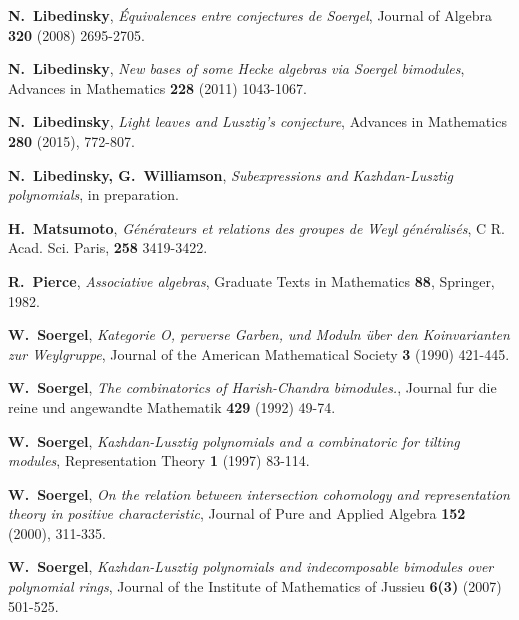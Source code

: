 \documentclass[12pt]{wart}
\theoremstyle{remark}
\begin{document}
\begin{thebibliography}{10}
 \textbf{N.~Libedinsky}, \emph{\'Equivalences entre conjectures de Soergel}, Journal of Algebra \textbf{320} (2008) 2695-2705.





 \textbf{N.~Libedinsky}, \emph{New bases of some Hecke algebras via Soergel bimodules}, Advances in Mathematics  \textbf{228}  (2011) 1043-1067.

 \textbf{N.~Libedinsky}, \emph{Light leaves and Lusztig's conjecture}, Advances in Mathematics  \textbf{280} (2015),  772-807.

  \textbf{N.~Libedinsky, G.~Williamson}, \emph{Subexpressions and Kazhdan-Lusztig polynomials}, in preparation.

 \textbf{H.~Matsumoto}, \emph{G\'en\'erateurs et relations des groupes de Weyl g\'en\'eralis\'es},  C R. Acad. Sci. Paris, \textbf{258} 3419-3422.


 \textbf{R.~Pierce}, \emph{Associative algebras}, Graduate Texts in Mathematics \textbf{ 88}, Springer, 1982.



\textbf{W.~Soergel}, \emph{Kategorie O, perverse Garben, und Moduln \"uber den Koinvarianten zur Weylgruppe}, Journal of the American Mathematical Society \textbf{3} (1990) 421-445.

 \textbf{W.~Soergel}, \emph{The combinatorics of Harish-Chandra bimodules.}, Journal fur die reine und angewandte Mathematik \textbf{429} (1992) 49-74.

 \textbf{W.~Soergel}, \emph{Kazhdan-Lusztig polynomials and a combinatoric for tilting modules}, Representation Theory \textbf{1}  (1997)  83-114.


   \textbf{W.~Soergel}, \emph{On the relation between intersection cohomology and representation theory in positive characteristic},  Journal of Pure and Applied Algebra \textbf{152}  (2000), 311-335.

   \textbf{W.~Soergel}, \emph{Kazhdan-Lusztig polynomials and indecomposable bimodules over polynomial rings}, Journal of the Institute of Mathematics of Jussieu  \textbf{6(3)} (2007) 501-525.

\end{thebibliography}
\end{document}
